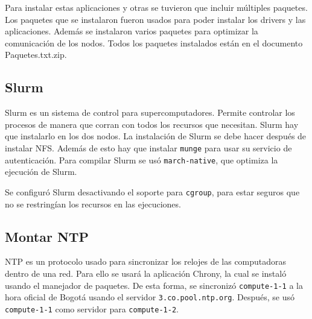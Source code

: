 \documentclass[conference,compsoc]{IEEEtran}
\begin{document}
Para instalar estas aplicaciones y otras se tuvieron que incluir múltiples paquetes. Los paquetes que se instalaron fueron usados para poder instalar los drivers y las aplicaciones. Además se instalaron varios paquetes para optimizar la comunicación de los nodos. Todos los paquetes instalados están en el documento Paquetes.txt.zip.
\subsection{Slurm}
Slurm es un sistema de control para supercomputadores. Permite controlar los procesos de manera que corran con todos los recursos que necesitan. Slurm hay que instalarlo en los dos nodos. La instalación de Slurm se debe hacer después de instalar NFS. Además de esto hay que instalar \verb|munge| para usar su servicio de autenticación. Para compilar Slurm se usó \verb|march-native|, que optimiza la ejecución de Slurm.

Se configuró Slurm desactivando el soporte para \verb|cgroup|, para estar seguros que no se restringían los recursos en las ejecuciones.

\subsection{Montar NTP}
NTP es un protocolo usado para sincronizar los relojes de las computadoras dentro de una red. Para ello se usará la aplicación Chrony, la cual se instaló usando el manejador de paquetes. De esta forma, se sincronizó \verb|compute-1-1| a la hora oficial de Bogotá usando el servidor \verb|3.co.pool.ntp.org|. Después, se usó \verb|compute-1-1| como servidor para \verb|compute-1-2|.





\end{document}

